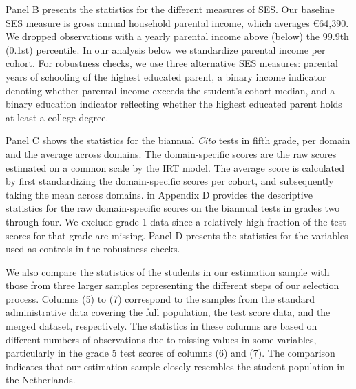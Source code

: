 Panel B presents the statistics for the different measures of SES. Our baseline SES measure is gross annual household parental income, which averages \euro64,390. We dropped observations with a yearly parental income above (below) the 99.9th (0.1st) percentile. In our analysis below we standardize parental income per cohort. For robustness checks, we use three alternative SES measures: parental years of schooling of the highest educated parent, a binary income indicator denoting whether parental income exceeds the student's cohort median, and a binary education indicator reflecting whether the highest educated parent holds at least a college degree.

Panel C shows the statistics for the biannual \textit{Cito} tests in fifth grade, per domain and the average across domains. The domain-specific scores are the raw scores estimated on a common scale by the IRT model. The average score is calculated by first standardizing the domain-specific scores per cohort, and subsequently taking the mean across domains.  in Appendix D provides the descriptive statistics for the raw domain-specific scores on the biannual tests in grades two through four. We exclude grade 1 data since a relatively high fraction of the test scores for that grade are missing. Panel D presents the statistics for the variables used as controls in the robustness checks.

We also compare the statistics of the students in our estimation sample with those from three larger samples representing the different steps of our selection process. Columns (5) to (7) correspond to the samples from the standard administrative data covering the full population, the test score data, and the merged dataset, respectively. The statistics in these columns are based on different numbers of observations due to missing values in some variables, particularly in the grade 5 test scores of columns (6) and (7). The comparison indicates that our estimation sample closely resembles the student population in the Netherlands.